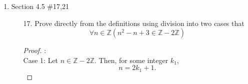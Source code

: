 \documentclass[12pt]{article}
\newcommand{\Z}{\mathbb{Z}}
\newcommand{\odd}[0]{\mathbb{Z} - 2\mathbb{Z}}
\newcommand{\paren}[1]{\left( #1 \right)}
\newcommand{\zero}{\{0\}}
\begin{document}
\begin{enumerate}
\begin{enumerate}
\begin{proof}
                \end{proof}

            \item[48.] Prove that for any non-negative integer $n$, if the sum of the digits of $n$ is divisible by 3, then $n$ is divisible by 3. 
                \begin{proof}
                    let $n$ be an integer, whose decimal representation can be written as follows
                    \[
                    n = \overline{d_id_{i-1}\ldots d_1d_0}
                    \]
                    Where $ i \in \Z^+ \cup \zero$ and It can be rewritten in the form
                    \[
                    n = d_i\cdot \paren{ \paren{10^i -1} +1}  + d_{i-1}\cdot \paren{\paren{10^{i-1} -1} +1}
                    \ldots d_1 (10 -1 +1)+d_0
                    \]
                    Multiply some of the elements out of the parenthesis, we get, 
                    \[
                    n = d_i + \paren{10^i - 1} + d_{i-1}+ \paren{10^{i-1}-1} \ldots d_1 + 9 + d_0
                    \]
                    notice that $\paren{10^i - 1}$ can be rewritten as 
                    \[
                    \paren{10^i - 1} = \sum_{k=0}^{i-1} 9 \cdot 10^k
                    \]
                    which is divisible by 3, so if $d_i + d_{i-1} \ldots d_1 + d_0$ is divisible by 3, then the number $n$ is divisible by 3. 
                \end{proof}
        \end{enumerate}

        \newpage

        
    \item Section 4.5 \#17,21

        \begin{enumerate}
            \item[17.] Prove directly from the definitions using division into two cases that 
            \[
            \forall n \in \Z \paren{n^2 - n +3 \in \odd }
            \]
            \begin{proof}:\\
                Case 1: Let \( n \in \odd \). Then, for some integer \( k_1 \),
                    \[ n = 2k_1 + 1. \]
                    

\end{proof}
\end{enumerate}
\end{enumerate}
\end{document}
